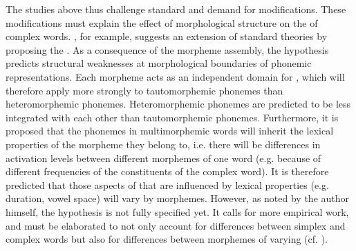  The studies above thus challenge standard  and demand for modifications. These modifications must explain the effect of morphological structure on the  of complex words.  
 \cite{CohenGoldberg.2013}, for example, suggests an extension of standard theories by proposing the . As a consequence of the morpheme assembly, the hypothesis predicts structural weaknesses at morphological boundaries of phonemic representations. Each morpheme acts as an independent domain for , which will therefore apply more strongly to tautomorphemic phonemes than heteromorphemic phonemes. Heteromorphemic phonemes are predicted to be less integrated with each other than tautomorphemic phonemes. Furthermore, it is proposed that the phonemes in multimorphemic words will inherit the lexical properties of the morpheme they belong to, i.e. there will be differences in activation levels between different morphemes of one word (e.g. because of different frequencies of the constituents of the complex word). It is therefore predicted that those aspects of  that are influenced by lexical properties (e.g. duration, vowel space) will vary by morphemes. 
 However, as noted by the author himself, the hypothesis is not fully specified yet. It calls for more empirical work, and must be elaborated to not only account for differences between simplex and complex words but also for differences between morphemes of varying  (cf. \citealt[1057f.]{CohenGoldberg.2013}).
 
